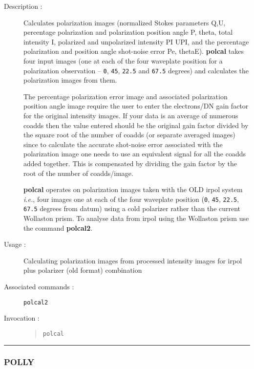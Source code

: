 \begin{description}

\item[Description :] Calculates polarization images (normalized Stokes
parameters Q,U, percentage polarization and polarization position angle
P, theta, total intensity I, polarized and unpolarized intensity PI
UPI, and the percentage polarization and position angle shot-noise
error Pe, thetaE). {\bf polcal} takes four input images (one at each of
the four waveplate position for a polarization observation -- {\tt 0},
{\tt 45}, {\tt 22.5} and {\tt 67.5} degrees) and calculates the polarization
images from them.

The percentage polarization error image and associated polarization
position angle image require the user to enter the electrons/DN gain
factor for the original intensity images.  If your data is an average of
numerous coadds then the value entered should be the original gain factor
divided by the square root of the number of coadds (or separate averaged
images) since to calculate the accurate shot-noise error associated with
the polarization image one needs to use an equivalent signal for all the
coadds added together.  This is compensated by dividing the gain factor
by the root of the number of coadds/image.

{\bf polcal} operates on polarization images taken with the OLD {\sc
irpol} system \emph{i.e.}, four images one at each of the four
waveplate position ({\tt 0}, {\tt 45}, {\tt 22.5}, {\tt 67.5} degrees
from datum) using a cold polarizer rather than the current Wollaston
prism.  To analyse data from {\sc irpol} using the Wollaston prism use
the command {\bf polcal2}.

\item[Usage :] Calculating polarization images from processed intensity
images for {\sc irpol} plus polarizer (old format) combination

\item[Associated commands :] {\tt polcal2}

\item[Invocation :]

\begin{quote}{\tt  polcal }\end{quote}

\end{description}

\hrule 
\subsubsection*{\label{POLLY}POLLY}

